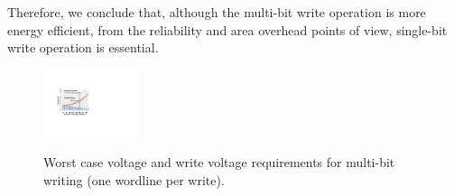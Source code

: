Therefore, we conclude that, although the multi-bit write operation is
more energy efficient, from the reliability and area overhead points of
view, single-bit write operation is essential.


\begin{figure}%
\centering\label{fig:multiV}
  \includegraphics[width=0.25\textwidth]{./figures/multi_V_one.pdf}\\
  \caption{Worst case voltage and write voltage requirements for multi-bit writing (one wordline per write).}\label{fig:reliable_region}
    \vspace{-10pt}
\end{figure}

